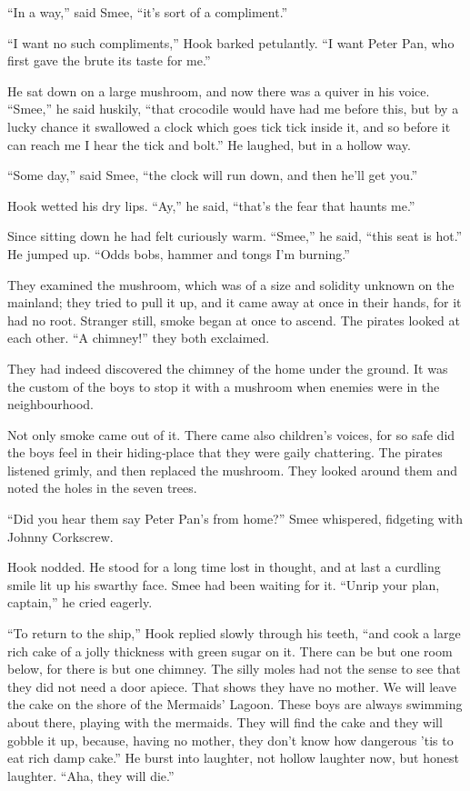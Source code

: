 “In a way,” said Smee, “it’s sort of a compliment.”

“I want no such compliments,” Hook barked petulantly.
“I want Peter Pan, who first gave the brute its taste for me.”

He sat down on a large mushroom, and now there was a quiver in his voice.
“Smee,” he said huskily, “that crocodile would have had me before this,
but by a lucky chance it swallowed a clock which goes tick tick inside it,
and so before it can reach me I hear the tick and bolt.”
He laughed, but in a hollow way.

“Some day,” said Smee, “the clock will run down, and then he’ll get you.”

Hook wetted his dry lips.
“Ay,” he said, “that’s the fear that haunts me.”

Since sitting down he had felt curiously warm.
“Smee,” he said, “this seat is hot.”
He jumped up.
“Odds bobs, hammer and tongs I’m burning.”

They examined the mushroom, which was of a size and solidity unknown on the mainland;
they tried to pull it up, and it came away at once in their hands, for it had no root.
Stranger still, smoke began at once to ascend.
The pirates looked at each other.
“A chimney!\@” they both exclaimed.

They had indeed discovered the chimney of the home under the ground.
It was the custom of the boys to stop it with a mushroom when enemies were in the neighbourhood.

Not only smoke came out of it.
There came also children’s voices,
for so safe did the boys feel in their hiding‐place that they were gaily chattering.
The pirates listened grimly, and then replaced the mushroom.
They looked around them and noted the holes in the seven trees.

“Did you hear them say Peter Pan’s from home?\@” Smee whispered,
fidgeting with Johnny Corkscrew.

Hook nodded.
He stood for a long time lost in thought,
and at last a curdling smile lit up his swarthy face.
Smee had been waiting for it.
“Unrip your plan, captain,” he cried eagerly.

“To return to the ship,” Hook replied slowly through his teeth,
“and cook a large rich cake of a jolly thickness with green sugar on it.
There can be but one room below, for there is but one chimney.
The silly moles had not the sense to see that they did not need a door apiece.
That shows they have no mother.
We will leave the cake on the shore of the Mermaids’ Lagoon.
These boys are always swimming about there, playing with the mermaids.
They will find the cake and they will gobble it up,
because, having no mother, they don’t know how dangerous ’tis to eat rich damp cake.”
He burst into laughter, not hollow laughter now, but honest laughter.
“Aha, they will die.”


